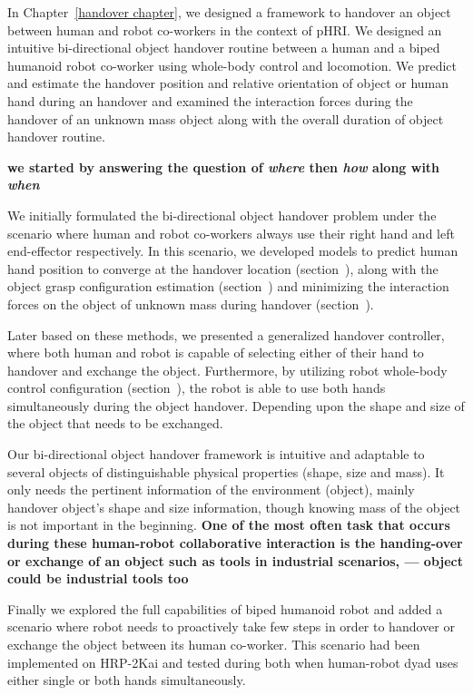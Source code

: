 In Chapter~\ref{handover chapter}, we designed a framework to handover an object between human and robot co-workers in the context of pHRI. We designed an intuitive bi-directional object handover routine between a human and a biped humanoid robot co-worker using whole-body control and locomotion. We predict and estimate the handover position and relative orientation of object or human hand during an handover and examined the interaction forces during the handover of an unknown mass object along with the overall duration of object handover routine.

\textbf{we started by answering the question of \textit{where} then \textit{how} along with \textit{when}}

We initially formulated the bi-directional object handover problem under the scenario where human and robot co-workers always use their right hand and left end-effector respectively. In this scenario, we developed models to predict human hand position to converge at the handover location (section~), along with the object grasp configuration estimation (section~) and minimizing the interaction forces on the object of unknown mass during handover (section~).

Later based on these methods, we presented a generalized handover controller, where both human and robot is capable of selecting either of their hand to handover and exchange the object. Furthermore, by utilizing robot whole-body control configuration (section~), the robot is able to use both hands simultaneously during the object handover. Depending upon the shape and size of the object that needs to be exchanged.

Our bi-directional object handover framework is intuitive and adaptable to several objects of distinguishable physical properties (shape, size and mass). It only needs the pertinent information of the environment (object), mainly handover object's shape and size information, though knowing mass of the object is not important in the beginning.
\textbf{One of the most often task that occurs during these human-robot collaborative interaction is the handing-over or exchange of an object such as tools in industrial scenarios, --- object could be industrial tools too}

Finally we explored the full capabilities of biped humanoid robot and added a scenario where robot needs to proactively take few steps in order to handover or exchange the object between its human co-worker. This scenario had been implemented on HRP-2Kai and tested during both when human-robot dyad uses either single or both hands simultaneously.



\clearpage %
\pagestyle{fancy}














